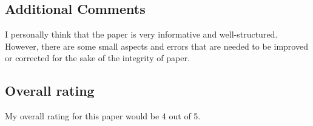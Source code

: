 \documentclass[ieeetran]{article}
\begin{document}
\subsection*{Additional Comments} %
\label{sub:additional_comments}
I personally think that the paper is very informative and well-structured. However, there are some small aspects and errors that are needed to be improved or corrected for the sake of the integrity of paper.

\subsection*{Overall rating} %
\label{sub:overall_rating}
My overall rating for this paper would be 4 out of 5.
\end{document}

